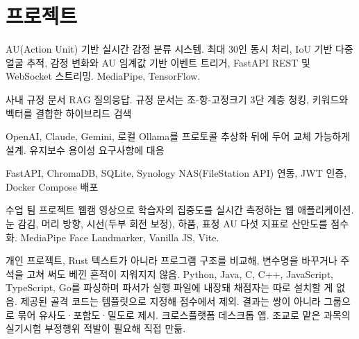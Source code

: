 \documentclass[korean,small]{cv}
\begin{document}
\section{프로젝트}
  {}
  {AU(Action Unit) 기반 실시간 감정 분류 시스템. 최대 30인 동시 처리,
   IoU 기반 다중 얼굴 추적, 감정 변화와 AU 임계값 기반 이벤트 트리거,
   FastAPI REST 및 WebSocket 스트리밍. MediaPipe, TensorFlow.}

  {}
  {\begin{cvitems}
     \item 사내 규정 문서 RAG 질의응답. 규정 문서는 조-항-고정크기 3단 계층 청킹,
           키워드와 벡터를 결합한 하이브리드 검색
     \item OpenAI, Claude, Gemini, 로컬 Ollama를 프로토콜 추상화 뒤에 두어 교체 가능하게 설계.
           유지보수 용이성 요구사항에 대응
     \item FastAPI, ChromaDB, SQLite, Synology NAS(FileStation API) 연동,
           JWT 인증, Docker Compose 배포
   \end{cvitems}}

  {수업 팀 프로젝트}
  {}
  {웹캠 영상으로 학습자의 집중도를 실시간 측정하는 웹 애플리케이션.
   눈 감김, 머리 방향, 시선(두부 회전 보정), 하품, 표정 AU 다섯 지표로 산만도를 점수화.
   MediaPipe Face Landmarker, Vanilla JS, Vite.}

  {개인 프로젝트, Rust}
  {}
  {텍스트가 아니라 프로그램 구조를 비교해, 변수명을 바꾸거나 주석을 고쳐 써도
   베낀 흔적이 지워지지 않음. Python, Java, C, C++, JavaScript, TypeScript, Go를
   파싱하며 파서가 실행 파일에 내장돼 채점자는 따로 설치할 게 없음.
   제공된 골격 코드는 템플릿으로 지정해 점수에서 제외. 결과는 쌍이 아니라 그룹으로
   묶어 유사도·포함도·밀도로 제시. 크로스플랫폼 데스크톱 앱.
   조교로 맡은 과목의 실기시험 부정행위 적발이 필요해 직접 만듦.}
\end{document}
